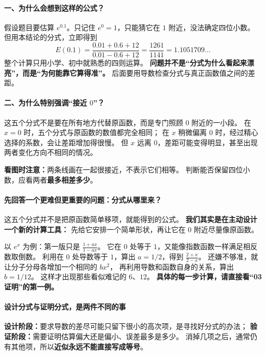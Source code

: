 \clearpage
\begin{explanationbox}
\paragraph{一、为什么会想到这样的公式？}
假设题目要估算 $e^{0.1}$。只记住 $e^0=1$，只能猜它在 $1$ 附近，没法确定四位小数。
但用本结论的分式，立即得到
\[
E(0.1)=\frac{0.01+0.6+12}{0.01-0.6+12}
=\frac{1261}{1141}=1.1051709\ldots
\]
整个计算只用小学、初中就熟悉的四则运算。
\textbf{问题并不是“分式为什么看起来漂亮”，而是“为何能靠它算得准”。}
后面要用导数检查分式与真正函数值之间的差距。

\paragraph{二、为什么特别强调“接近 $0$”？}
这五个分式不是要在所有地方代替原函数，而是专门照顾 $0$ 附近的一小段。
在 $x=0$ 时，五个分式与原函数的数值都完全相同；
在 $x$ 稍微偏离 $0$ 时，经过精心选择的系数，会让差距增加得很慢。
但 $x$ 远离 $0$，差距可能变得明显，甚至出现两者变化方向不相同的情况。

\textbf{看图时注意：}两条线画在一起很接近，不表示它们相等。
判断能否保留四位小数，应看两者\textbf{最多相差多少}。


\paragraph{先回答一个更难但更重要的问题：分式从哪里来？}
这五个分式并不是把原函数简单移项，就能得到的公式。
\textbf{我们其实是在主动设计一个新的计算工具：}
先给它安排一个简单形状，再让它在 $0$ 附近尽量像原函数。

以 $e^x$ 为例：第一版只是 $\frac{1+ax}{1-ax}$。
它在 $0$ 处等于 $1$，又能像指数函数一样满足相反数取倒数。
利用在 $0$ 处导数等于 $1$，算出 $a=1/2$，得到 $\frac{2+x}{2-x}$。
还嫌不够准，就让分子分母各增加一个相同的 $bx^2$，
再利用导数和函数自身的关系，算出 $b=1/12$。
这样才出现那些看似难记的 $6$、$12$。
\textbf{具体的每一步计算，请直接看“03 证明”的第一例。}

\paragraph{设计分式与证明分式，是两件不同的事}
\textbf{设计阶段：}要求导数的差尽可能只留下很小的高次项，是寻找好分式的办法；
\textbf{验证阶段：}需要证明估算偏大还是偏小、误差最多是多少。
消掉几项之后，通常仍有其他项，所以\textbf{近似永远不能直接写成等号}。



\end{explanationbox}
